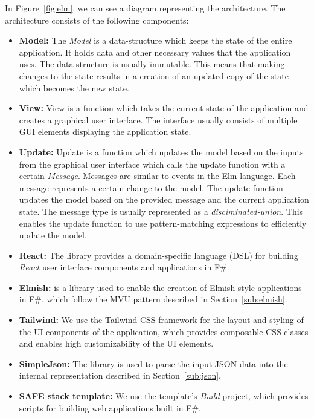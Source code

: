 In Figure~\ref{fig:elm}, we can see a diagram representing the architecture.
The architecture consists of the following components:
\begin{itemize}
	\item \textbf{Model:} The \emph{Model} is a data-structure which keeps the state of the entire application. It
	      holds data and other necessary values that the application uses.
	      The data-structure is usually immutable.
	      This means that making changes to the state results in a creation
	      of an updated copy of the state which becomes the new state.

	\item \textbf{View:} View is a function which takes the current state of the application and creates a
	      graphical user interface. The interface usually consists of multiple GUI elements displaying the application state.

	\item \textbf{Update:} Update is a function which updates the model based on the inputs from the graphical user interface which calls the update function with a certain \emph{Message}.
	      Messages are similar to events in the Elm language. Each message represents a certain change to the model.
	      The update function updates the model based on the provided message and the current application state.
	      The message type is usually represented as a \emph{disciminated-union}.
	      This enables the update function to use pattern-matching expressions to efficiently update the model.
\end{itemize}



\begin{itemize}
	\item \textbf{React:} The \citet{feliz} library provides a domain-specific language (DSL) for building \emph{React} user interface components and applications in F\#.
	\item \textbf{Elmish:} \citet{elmish} is a library used to enable the creation of Elmish style applications in F\#, which follow the MVU pattern described in Section~\ref{sub:elmish}.
	\item \textbf{Tailwind:} We use the Tailwind CSS framework for the layout and styling of the UI components of the application, which provides composable CSS classes and enables high customizability of the UI elements.
	\item \textbf{SimpleJson:} The \citet{simpleJson} library is used to parse the input JSON data into the internal representation described in Section~\ref{sub:json}.
	\item \textbf{SAFE stack template:} We use the \citet{safestack} template's \emph{Build} project, which provides scripts for building web applications built in F\#.
\end{itemize}
